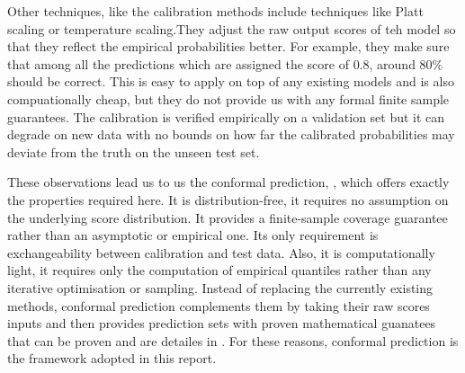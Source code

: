\vspace{0.15cm}
\noindent Other techniques, like the calibration methods include techniques like Platt scaling or temperature scaling.They
adjust the raw output scores of teh model so that they reflect the empirical probabilities better. For example, they make
sure that among all the predictions which are assigned the score of $0.8$, around $80\%$ should be correct. This is 
easy to apply on top of any existing models and is also compuationally cheap, but they do not provide us with any formal 
finite sample guarantees. The calibration is verified empirically on a validation set but it can degrade on new data with no
bounds on how far the calibrated probabilities may deviate from the truth on the unseen test set. 


\vspace{0.15cm}
\noindent These observations lead us to us the conformal prediction, \cite{vovk2005algorithmic}, which offers exactly 
the properties required here. It is distribution-free, it requires no assumption on the underlying score distribution. 
It provides a finite-sample coverage guarantee rather than an asymptotic or empirical one. Its only requirement is 
exchangeability between calibration and test data. Also, it is computationally light, it requires only the computation 
of empirical quantiles rather than any iterative optimisation or sampling. Instead of replacing the currently existing 
methods, conformal prediction complements them by taking their raw scores inputs and then provides prediction sets with proven 
mathematical guanatees that can be proven and are detailes in . For these reasons, conformal 
prediction is the framework adopted in this report. 







